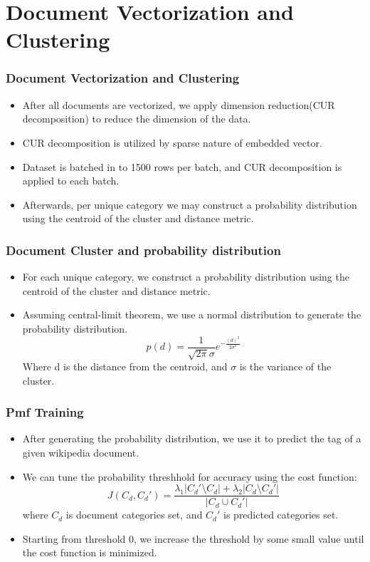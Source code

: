 \documentclass[
    10pt %
    16:9, %
]{beamer}
\begin{document}
\section{Document Vectorization and Clustering}
\begin{frame}
  \frametitle{Document Vectorization and Clustering}
  \begin{itemize}
    \item After all documents are vectorized, we apply dimension reduction(CUR decomposition) to reduce the dimension of the data.
    \item CUR decomposition is utilized by sparse nature of embedded vector.
    \item Dataset is batched in to 1500 rows per batch, and CUR decomposition is applied to each batch.
    \item Afterwards, per unique category we may construct a probability distribution using the centroid of the cluster and distance metric.
  \end{itemize}
\end{frame}

\begin{frame}
  \frametitle{Document Cluster and probability distribution}
  \begin{itemize}
    \item For each unique category, we construct a probability distribution using the centroid of the cluster and distance metric.
    \item Assuming central-limit theorem, we use a normal distribution to generate the probability distribution.
    \[
      p(d) = \frac{1}{\sqrt{2\pi}\sigma}e^{-\frac{(d)^2}{2\sigma^2}}
    \]
    Where d is the distance from the centroid, and \(\sigma\) is the variance of the cluster.
  \end{itemize}
\end{frame}

\begin{frame}
  \frametitle{Pmf Training}
  \begin{itemize}
    \item After generating the probability distribution, we use it to predict the tag of a given wikipedia document.
    \item We can tune the probability threshhold for accuracy using the cost function:
    \[
      J(C_d, C_d') = \frac{\lambda_1|C_d'\setminus C_d| + \lambda_2|C_d\setminus C_d'|}{|C_d\cup C_d'|}
    \]
    where $C_d$ is document categories set, and $C_d'$ is predicted categories set.
    \item Starting from threshold 0, we increase the threshold by some small value until the cost function is minimized.
  \end{itemize}
\end{frame}
\end{document}

